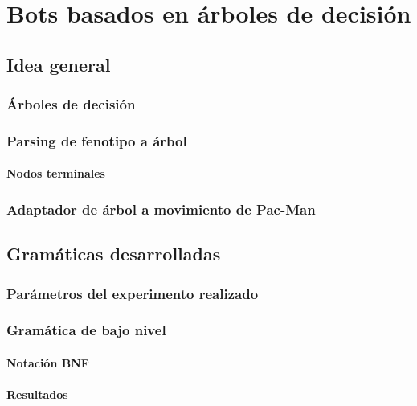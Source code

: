 \chapter{Bots basados en árboles de decisión}

\section{Idea general}

\subsection{Árboles de decisión}

\subsection{Parsing de fenotipo a árbol}

\subsubsection{Nodos terminales}

\subsection{Adaptador de árbol a movimiento de Pac-Man}

\section{Gramáticas desarrolladas}

\subsection{Parámetros del experimento realizado}

\subsection{Gramática de bajo nivel}

\subsubsection{Notación BNF}

\subsubsection{Resultados}

